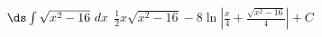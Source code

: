 {$\ds \int \sqrt{x^2-16}\ dx$
}
{$\frac12x\sqrt{x^2-16}-8\ln\left|\frac x4+\frac{\sqrt{x^2-16}}4\right|+C$
}